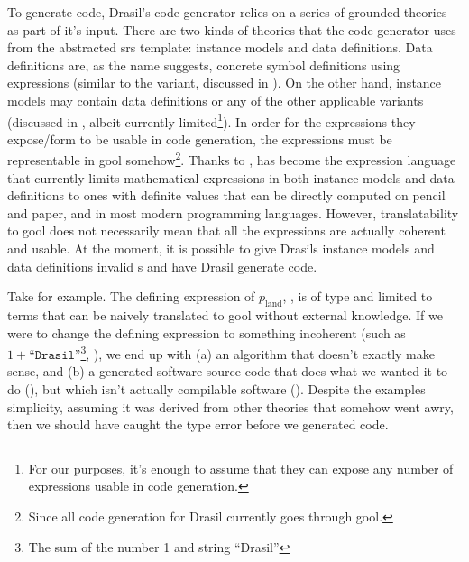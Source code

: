 To generate code, Drasil's code generator relies on a series of grounded
theories as part of it's input. There are two kinds of theories that the code
generator uses from the abstracted \acs{srs} template: instance models and data
definitions. Data definitions are, as the name suggests, concrete symbol
definitions using expressions (similar to the \EquationalModel{} \ModelKind{}
variant, discussed in
).
On the other hand, instance models may contain data definitions or any of the
other applicable \ModelKinds{} variants (discussed in
, albeit currently limited\footnote{For our
purposes, it's enough to assume that they can expose any number of expressions
usable in code generation.}). In order for the expressions they expose/form to
be usable in code generation, the expressions must be representable in
\acs{gool} somehow\footnote{Since all code generation for Drasil currently goes
through \acs{gool}.}. Thanks to , \Expr{} has become
the expression language that currently limits mathematical expressions in both
instance models and data definitions to ones with definite values that can be
directly computed on pencil and paper, and in most modern programming languages.
However, translatability to \acs{gool} does not necessarily mean that all the
expressions are actually coherent and usable. At the moment, it is possible to
give Drasils instance models and data definitions invalid \Expr{}s and have
Drasil generate code.

\pseudoExampleLandPosQDBadTyping{}

Take  for example. The defining expression of
\(p_\text{land}\), , is of type \Expr{} and limited to
terms that can be naively translated to \acs{gool} without external knowledge.
If we were to change the defining expression to something incoherent (such as
\(1 + \texttt{``Drasil''}\)\footnote{The sum of the number 1 and string
``Drasil''}, ), we end up with (a) an
algorithm that doesn't exactly make sense, and (b) a generated software source
code that does what we wanted it to do
(), but which isn't actually
compilable software ().
Despite the examples simplicity, assuming it was derived from other theories
that somehow went awry, then we should have caught the type error before we
generated code.

